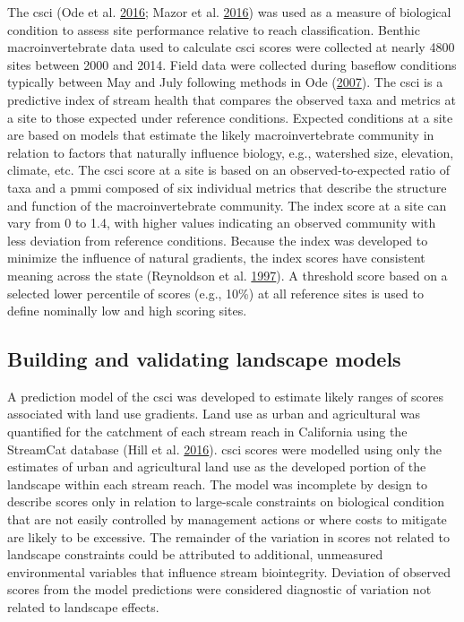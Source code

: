 \documentclass[]{article}
\begin{document}
The \ac{csci} (Ode et al. \protect\hyperlink{ref-Ode16}{2016}; Mazor et
al. \protect\hyperlink{ref-Mazor16}{2016}) was used as a measure of
biological condition to assess site performance relative to reach
classification. Benthic macroinvertebrate data used to calculate
\ac{csci} scores were collected at nearly 4800 sites between 2000 and
2014. Field data were collected during baseflow conditions typically
between May and July following methods in Ode
(\protect\hyperlink{ref-Ode07}{2007}). The \ac{csci} is a predictive
index of stream health that compares the observed taxa and metrics at a
site to those expected under reference conditions. Expected conditions
at a site are based on models that estimate the likely macroinvertebrate
community in relation to factors that naturally influence biology, e.g.,
watershed size, elevation, climate, etc. The \ac{csci} score at a site
is based on an observed-to-expected ratio of taxa and a \ac{pmmi}
composed of six individual metrics that describe the structure and
function of the macroinvertebrate community. The index score at a site
can vary from 0 to 1.4, with higher values indicating an observed
community with less deviation from reference conditions. Because the
index was developed to minimize the influence of natural gradients, the
index scores have consistent meaning across the state (Reynoldson et al.
\protect\hyperlink{ref-Reynoldson97}{1997}). A threshold score based on
a selected lower percentile of scores (e.g., 10\%) at all reference
sites is used to define nominally low and high scoring sites.

\subsection{Building and validating landscape
models}\label{building-and-validating-landscape-models}

A prediction model of the \ac{csci} was developed to estimate likely
ranges of scores associated with land use gradients. Land use as urban
and agricultural was quantified for the catchment of each stream reach
in California using the StreamCat database (Hill et al.
\protect\hyperlink{ref-Hill16}{2016}). \ac{csci} scores were modelled
using only the estimates of urban and agricultural land use as the
developed portion of the landscape within each stream reach. The model
was incomplete by design to describe scores only in relation to
large-scale constraints on biological condition that are not easily
controlled by management actions or where costs to mitigate are likely
to be excessive. The remainder of the variation in scores not related to
landscape constraints could be attributed to additional, unmeasured
environmental variables that influence stream biointegrity. Deviation of
observed scores from the model predictions were considered diagnostic of
variation not related to landscape effects.
\end{document}
